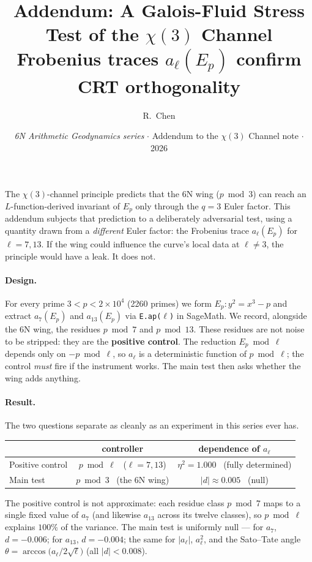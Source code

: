 \documentclass[11pt]{article}
\title{\textbf{Addendum: A Galois-Fluid Stress Test of the $\chi(3)$ Channel\\
\large Frobenius traces $a_\ell(E_p)$ confirm CRT orthogonality}}
\author{R.\ Chen}
\affil{GUT Geoservice Inc., Montr\'eal}
\date{\textit{6N Arithmetic Geodynamics series} $\cdot$ Addendum to the $\chi(3)$ Channel note $\cdot$ 2026}
\begin{document}
\maketitle

\noindent
The $\chi(3)$-channel principle predicts that the 6N wing ($p\bmod 3$) can reach an
$L$-function-derived invariant of $E_p$ only through the $q=3$ Euler factor. This addendum
subjects that prediction to a deliberately adversarial test, using a quantity drawn from a
\emph{different} Euler factor: the Frobenius trace $a_\ell(E_p)$ for $\ell = 7, 13$. If the wing
could influence the curve's local data at $\ell \neq 3$, the principle would have a leak. It does not.

\paragraph{Design.} For every prime $3 < p < 2\times10^4$ (2260 primes) we form $E_p : y^2 = x^3 - p$
and extract $a_7(E_p)$ and $a_{13}(E_p)$ via \texttt{E.ap($\ell$)} in SageMath. We record, alongside
the 6N wing, the residues $p\bmod 7$ and $p\bmod 13$. These residues are not noise to be stripped:
they are the \textbf{positive control}. The reduction $E_p \bmod \ell$ depends only on $-p \bmod \ell$,
so $a_\ell$ is a deterministic function of $p \bmod \ell$; the control \emph{must} fire if the
instrument works. The main test then asks whether the wing adds anything.

\paragraph{Result.} The two questions separate as cleanly as an experiment in this series ever has.

\begin{table}[h]
\centering
\begin{tabular}{lcc}
\toprule
 & controller & dependence of $a_\ell$ \\
\midrule
Positive control & $p \bmod \ell$ \ ($\ell = 7, 13$) & $\eta^2 = 1.000$ \ (fully determined) \\
Main test        & $p \bmod 3$ \ (the 6N wing)        & $|d| \approx 0.005$ \ (null) \\
\bottomrule
\end{tabular}
\end{table}

\noindent
The positive control is not approximate: each residue class $p \bmod 7$ maps to a single fixed value
of $a_7$ (and likewise $a_{13}$ across its twelve classes), so $p \bmod \ell$ explains $100\%$ of the
variance. The main test is uniformly null --- for $a_7$, $d = -0.006$; for $a_{13}$, $d = -0.004$; the
same for $|a_\ell|$, $a_\ell^2$, and the Sato--Tate angle $\theta = \arccos\!\big(a_\ell/2\sqrt{\ell}\big)$
(all $|d| < 0.008$).
\end{document}

